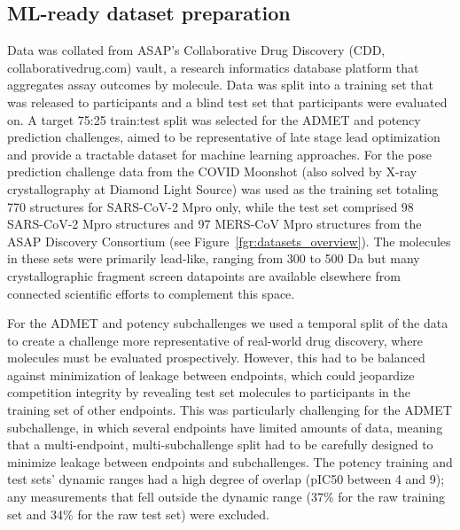 \documentclass[journal=jcim,manuscript=article]{achemso}
\begin{document}
\subsection{ML-ready dataset preparation}

Data was collated from ASAP’s Collaborative Drug Discovery (CDD, collaborativedrug.com) vault, a research informatics database platform that aggregates assay outcomes by molecule. Data was split into a training set that was released to participants and a blind test set that participants were evaluated on. A target 75:25 train:test split was selected for the ADMET and potency prediction challenges, aimed to be representative of late stage lead optimization and provide a tractable dataset for machine learning approaches. For the pose prediction challenge data from the COVID Moonshot\cite{boby_2023} (also solved by X-ray crystallography at Diamond Light Source) was used as the training set totaling 770 structures for SARS-CoV-2 Mpro only, while the test set comprised 98 SARS-CoV-2 Mpro structures and 97 MERS-CoV Mpro structures from the ASAP Discovery Consortium (see Figure~\ref{fgr:datasets_overview}). The molecules in these sets were primarily lead-like, ranging from 300 to 500 Da but many crystallographic fragment screen datapoints are available elsewhere from connected scientific efforts to complement this space.\cite{boby_2023}

For the ADMET and potency subchallenges we used a temporal split of the data to create a challenge more representative of real-world drug discovery, where molecules must be evaluated prospectively\cite{sheridan_time-split_2013}. However, this had to be balanced against minimization of leakage between endpoints, which could jeopardize competition integrity by revealing test set molecules to participants in the training set of other endpoints. This was particularly challenging for the ADMET subchallenge, in which several endpoints have limited amounts of data, meaning that a multi-endpoint, multi-subchallenge split had to be carefully designed to minimize leakage between endpoints and subchallenges. The potency training and test sets' dynamic ranges had a high degree of overlap (pIC50 between 4 and 9); any measurements that fell outside the dynamic range (37\% for the raw training set and 34\% for the raw test set) were excluded.
\end{document}
